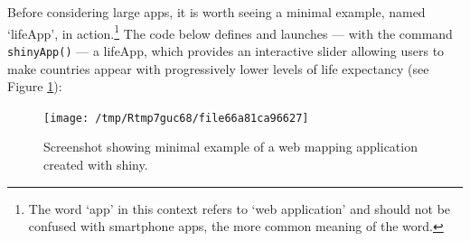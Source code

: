 \documentclass[]{krantz}
\newenvironment{Shaded}{\begin{snugshade}}{\end{snugshade}}
\newcommand{\CommentTok}[1]{\textcolor[rgb]{0.37,0.37,0.37}{\textit{#1}}}
\newcommand{\ControlFlowTok}[1]{\textcolor[rgb]{0.27,0.27,0.27}{\textbf{#1}}}
\newcommand{\DataTypeTok}[1]{\textcolor[rgb]{0.27,0.27,0.27}{#1}}
\newcommand{\DecValTok}[1]{\textcolor[rgb]{0.06,0.06,0.06}{#1}}
\newcommand{\KeywordTok}[1]{\textcolor[rgb]{0.27,0.27,0.27}{\textbf{#1}}}
\newcommand{\NormalTok}[1]{#1}
\newcommand{\OperatorTok}[1]{\textcolor[rgb]{0.43,0.43,0.43}{\textbf{#1}}}
\newcommand{\StringTok}[1]{\textcolor[rgb]{0.5,0.5,0.5}{#1}}
\let\rmarkdownfootnote\footnote%
\def\footnote{\protect\rmarkdownfootnote}
\begin{document}
Before considering large apps, it is worth seeing a minimal example, named `lifeApp', in action.\footnote{The word `app' in this context refers to `web application' and should not be confused with smartphone apps, the more common meaning of the word.}
The code below defines and launches --- with the command \texttt{shinyApp()} --- a lifeApp, which provides an interactive slider allowing users to make countries appear with progressively lower levels of life expectancy (see Figure \ref{fig:lifeApp}):

\begin{Shaded}
\end{Shaded}

\begin{figure}[t]

{\centering \texttt{[image: /tmp/Rtmp7guc68/file66a81ca96627]} 

}

\caption[Minimal example of a web mapping application.]{Screenshot showing minimal example of a web mapping application created with shiny.}\label{fig:lifeApp}
\end{figure}
\end{document}
